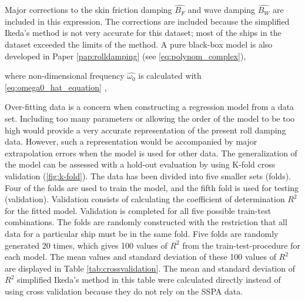 \noindent Major corrections to the skin friction damping $\hat{B_F}$ and wave damping $\hat{B_W}$ are included in this expression. The corrections are included because the simplified Ikeda's method is not very accurate for this dataset; most of the ships in the dataset exceeded the limits of the method. A pure black-box model is also developed in Paper \ref{pap:rolldamping} (see \autoref{eq:polynom_complex}),

\noindent where non-dimensional frequency $\hat{\omega_0}$ is calculated with \autoref{eq:omega0_hat_equation} \cite{himeno_prediction_1981},

Over-fitting data is a concern when constructing a regression model from a data set. Including too many parameters or allowing the order of the model to be too high would provide a very accurate representation of the present roll damping data. However, such a representation would be accompanied by major extrapolation errors when the model is used for other data. The generalization of the model can be assessed with a hold-out evaluation by using K-fold cross validation \cite{mosteller_handbook_1968} (\autoref{fig:k-fold}). The data has been divided into five smaller sets (folds). Four of the folds are used to train the model, and the fifth fold is used for testing (validation). Validation consists of calculating the coefficient of determination $R^2$ for the fitted model. Validation is completed for all five possible train-test combinations. 
The folds are randomly constructed with the restriction that all data for a particular ship must be in the same fold. Five folds are randomly generated 20 times, which gives 100 values of $R^2$ from the train-test-procedure for each model. The mean values and standard deviation of these 100 values of $R^2$ are displayed in Table \ref{tab:crossvalidation}. The mean and standard deviation of $R^2$ simplified Ikeda's method in this table were calculated directly instead of using cross validation because they do not rely on the SSPA data.

\clearpage
